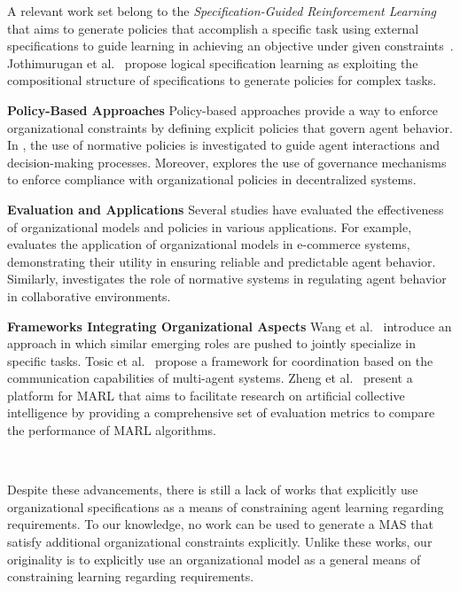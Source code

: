 \documentclass[runningheads]{llncs}
\theoremstyle{freethm}
\theoremstyle{proofoutline}
\begin{document}
A relevant work set belong to the \emph{Specification-Guided Reinforcement Learning} that aims to generate policies that accomplish a specific task using external specifications to guide learning in achieving an objective under given constraints~\cite{Bansal2022}. Jothimurugan et al.~\cite{Jothimurugan2021} propose logical specification learning as exploiting the compositional structure of specifications to generate policies for complex tasks.

\textbf{Policy-Based Approaches} \quad
%
Policy-based approaches provide a way to enforce organizational constraints by defining explicit policies that govern agent behavior. In \cite{krupanski2015norm}, the use of normative policies is investigated to guide agent interactions and decision-making processes. Moreover, \cite{vos2020governing} explores the use of governance mechanisms to enforce compliance with organizational policies in decentralized systems.

\textbf{Evaluation and Applications} \quad
%
Several studies have evaluated the effectiveness of organizational models and policies in various applications. For example, \cite{dignum2004agent} evaluates the application of organizational models in e-commerce systems, demonstrating their utility in ensuring reliable and predictable agent behavior. Similarly, \cite{andrighetto2013normative} investigates the role of normative systems in regulating agent behavior in collaborative environments.

\textbf{Frameworks Integrating Organizational Aspects} \quad
%
Wang et al.~\cite{Wang2020} introduce an approach in which similar emerging roles are pushed to jointly specialize in specific tasks. Tosic et al.~\cite{Tosic2010} propose a framework for coordination based on the communication capabilities of multi-agent systems. Zheng et al.~\cite{Zheng2018} present a platform for MARL that aims to facilitate research on artificial collective intelligence by providing a comprehensive set of evaluation metrics to compare the performance of MARL algorithms.

\

Despite these advancements, there is still a lack of works that explicitly use organizational specifications as a means of constraining agent learning regarding requirements. To our knowledge, no work can be used to generate a MAS that satisfy additional organizational constraints explicitly. Unlike these works, our originality is to explicitly use an organizational model as a general means of constraining learning regarding requirements.
\end{document}
